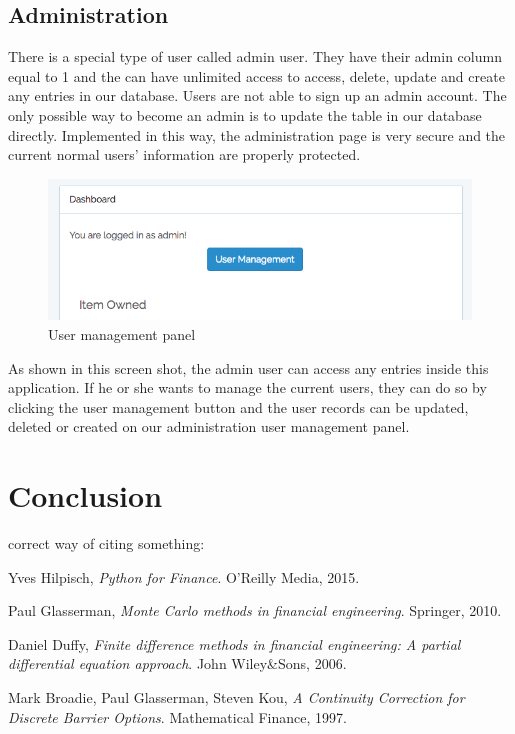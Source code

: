 \subsection{Administration}
There is a special type of user called admin user. They have their admin column equal to 1 and the can have unlimited access to access, delete, update and create any entries in our database. Users are not able to sign up an admin account. The only possible way to become an admin is to update the table in our database directly. Implemented in this way, the administration page is very secure and the current normal users' information are properly protected.
\begin{figure}[h]
      \centering
	\includegraphics[scale=0.3]{admin.png}
      \caption{User management panel}
\end{figure}
As shown in this screen shot, the admin user can access any entries inside this application. If he or she wants to manage the current users, they can do so by clicking the user management button and the user records can be updated, deleted or created on our administration user management panel.

\newpage

\section{Conclusion}

correct way of citing something: \cite{PythonForFinance}

\newpage
\begin{thebibliography}{9}
Yves Hilpisch,
\textit{Python for Finance}. 
O'Reilly Media, 2015.
 
Paul Glasserman,
\textit{Monte Carlo methods in financial engineering}.
Springer, 2010.

Daniel Duffy,
\textit{Finite difference methods in financial engineering: A partial differential equation approach}.
John Wiley\&Sons, 2006.

Mark Broadie, Paul Glasserman, Steven Kou,
\textit{A Continuity Correction for Discrete Barrier Options}.
Mathematical Finance, 1997.

\end{thebibliography}
